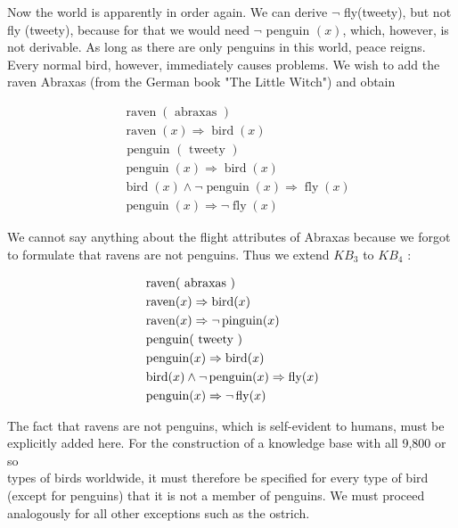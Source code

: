 \documentclass[10pt]{book}
\begin{document}
Now the world is apparently in order again. We can derive $\neg$ fly(tweety), but not fly (tweety), because for that we would need $\neg$ penguin $(x)$, which, however, is not derivable. As long as there are only penguins in this world, peace reigns. Every normal bird, however, immediately causes problems. We wish to add the raven Abraxas (from the German book "The Little Witch") and obtain

$$
\begin{aligned}
& \operatorname{raven}(\text { abraxas }) \\
& \operatorname{raven}(x) \Rightarrow \operatorname{bird}(x) \\
& \text { penguin }(\text { tweety }) \\
& \operatorname{penguin}(x) \Rightarrow \operatorname{bird}(x) \\
& \operatorname{bird}(x) \wedge \neg \operatorname{penguin}(x) \Rightarrow \operatorname{fly}(x) \\
& \operatorname{penguin}(x) \Rightarrow \neg \operatorname{fly}(x)
\end{aligned}
$$

We cannot say anything about the flight attributes of Abraxas because we forgot to formulate that ravens are not penguins. Thus we extend $K B_{3}$ to $K B_{4}$ :

$$
\begin{aligned}
& \operatorname{raven}(\text { abraxas }) \\
& \operatorname{raven}(x) \Rightarrow \operatorname{bird}(x) \\\index{PROLOG}
& \operatorname{raven}(x) \Rightarrow \neg \operatorname{pinguin}(x) \\
& \operatorname{penguin}(\text { tweety }) \\
& \operatorname{penguin}(x) \Rightarrow \operatorname{bird}(x) \\
& \operatorname{bird}(x) \wedge \neg \operatorname{penguin}(x) \Rightarrow \operatorname{fly}(x) \\
& \operatorname{penguin}(x) \Rightarrow \neg \operatorname{fly}(x)
\end{aligned}
$$

The fact that ravens are not penguins, which is self-evident to humans, must be explicitly added here. For the construction of a knowledge base with all 9,800 or so\\
types of birds worldwide, it must therefore be specified for every type of bird (except for penguins) that it is not a member of penguins. We must proceed analogously for all other exceptions such as the ostrich.
\end{document}
